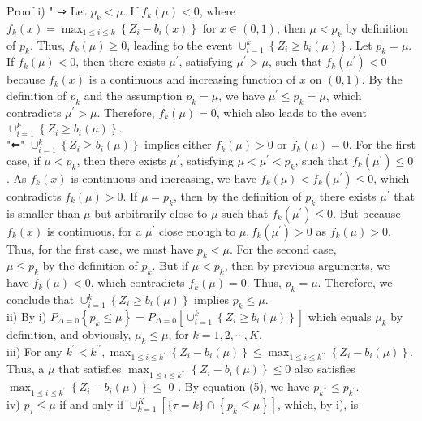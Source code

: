 \documentclass[10pt]{article}
\begin{document}
Proof i) " ⇒ Let $p_{k}<\mu$. If $f_{k}(\mu)<0$, where $f_{k}(x)=\max _{1 \leq i \leq k}\left\{Z_{i}-b_{i}(x)\right\}$ for $x \in(0,1)$, then $\mu<p_{k}$ by definition of $p_{k}$. Thus, $f_{k}(\mu) \geq 0$, leading to the event $\cup_{i=1}^{k}\left\{Z_{i} \geq b_{i}(\mu)\right\}$. Let $p_{k}=\mu$. If $f_{k}(\mu)<0$, then there exists $\mu^{\prime}$, satisfying $\mu^{\prime}>\mu$, such that $f_{k}\left(\mu^{\prime}\right)<0$ because $f_{k}(x)$ is a continuous and increasing function of $x$ on $(0,1)$. By the definition of $p_{k}$ and the assumption $p_{k}=\mu$, we have $\mu^{\prime} \leq p_{k}=\mu$, which contradicts $\mu^{\prime}>\mu$. Therefore, $f_{k}(\mu)=0$, which also leads to the event $\cup_{i=1}^{k}\left\{Z_{i} \geq b_{i}(\mu)\right\}$.\\
"⇐" $\cup_{i=1}^{k}\left\{Z_{i} \geq b_{i}(\mu)\right\}$ implies either $f_{k}(\mu)>0$ or $f_{k}(\mu)=0$. For the first case, if $\mu<p_{k}$, then there exists $\mu^{\prime}$, satisfying $\mu<\mu^{\prime}<p_{k}$, such that $f_{k}\left(\mu^{\prime}\right) \leq 0$. As $f_{k}(x)$ is continuous and increasing, we have $f_{k}(\mu)<f_{k}\left(\mu^{\prime}\right) \leq 0$, which contradicts $f_{k}(\mu)>0$. If $\mu=p_{k}$, then by the definition of $p_{k}$ there exists $\mu^{\prime}$ that is smaller than $\mu$ but arbitrarily close to $\mu$ such that $f_{k}\left(\mu^{\prime}\right) \leq 0$. But because $f_{k}(x)$ is continuous, for a $\mu^{\prime}$ close enough to $\mu, f_{k}\left(\mu^{\prime}\right)>0$ as $f_{k}(\mu)>0$. Thus, for the first case, we must have $p_{k}<\mu$. For the second case,\\
$\mu \leq p_{k}$ by the definition of $p_{k}$. But if $\mu<p_{k}$, then by previous arguments, we have $f_{k}(\mu)<0$, which contradicts $f_{k}(\mu)=0$. Thus, $p_{k}=\mu$. Therefore, we conclude that $\cup_{i=1}^{k}\left\{Z_{i} \geq b_{i}(\mu)\right\}$ implies $p_{k} \leq \mu$.\\
ii) By i) $P_{\Delta=0}\left\{p_{k} \leq \mu\right\}=P_{\Delta=0}\left[\cup_{i=1}^{k}\left\{Z_{i} \geq b_{i}(\mu)\right\}\right]$ which equals $\mu_{k}$ by definition, and obviously, $\mu_{k} \leq \mu$, for $k=1,2, \cdots, K$.\\
iii) For any $k^{\prime}<k^{\prime \prime}, \max _{1 \leq i \leq k^{\prime}}\left\{Z_{i}-b_{i}(\mu)\right\} \leq \max _{1 \leq i \leq k^{\prime \prime}}\left\{Z_{i}-b_{i}(\mu)\right\}$. Thus, a $\mu$ that satisfies $\max _{1 \leq i \leq k^{\prime \prime}}\left\{Z_{i}-b_{i}(\mu)\right\} \leq 0$ also satisfies $\max _{1 \leq i \leq k^{\prime}}\left\{Z_{i}-b_{i}(\mu)\right\} \leq$ 0 . By equation (5), we have $p_{k^{\prime \prime}} \leq p_{k^{\prime}}$.\\
iv) $p_{\tau} \leq \mu$ if and only if $\cup_{k=1}^{K}\left[\{\tau=k\} \cap\left\{p_{k} \leq \mu\right\}\right]$, which, by i), is
\end{document}
